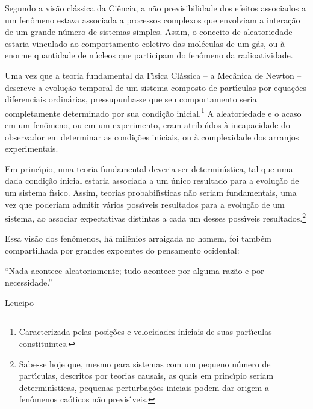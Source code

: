 Segundo a vis\~{a}o cl\'{a}ssica da Ci\^{e}ncia, a n\~{a}o previsibilidade dos efeitos associados a um fen\^{o}meno estava associada a processos complexos que envolviam a intera\c{c}\~{a}o de um grande n\'{u}mero de sistemas simples.
Assim, o conceito de aleatoriedade estaria vinculado ao comportamento coletivo das mol\'{e}culas de um g\'{a}s, ou \`{a} enorme quantidade de n\'{u}cleos que participam do fen\^{o}meno da radioatividade.

Uma vez que a teoria fundamental da F\'{\i}sica Cl\'{a}ssica -- a Mec\^{a}nica de Newton -- descreve a evolu\c{c}\~{a}o temporal
  de um sistema composto de  part\'{\i}culas por equa\c{c}\~{o}es diferenciais ordin\'{a}rias, pressupunha-se que seu comportamento seria completamente determinado por sua condi\c{c}\~{a}o  inicial.\footnote{Caracterizada pelas posi\c{c}\~{o}es e velocidades iniciais de suas part\'{\i}culas constituintes.}  A aleatoriedade e o acaso em um fen\^{o}meno, ou em um experimento, eram atribu\'{\i}dos \`{a} incapacidade do observador em determinar as condi\c{c}\~{o}es iniciais, ou \`{a} complexidade dos arranjos experimentais.

  Em princ\'{\i}pio,  uma teoria fundamental deveria ser determin\'{\i}stica, tal que  uma dada condi\c{c}\~{a}o inicial estaria associada a um \'{u}nico resultado para a evolu\c{c}\~{a}o de um sistema f\'{\i}sico.
  Assim, teorias probabil\'{\i}sticas n\~{a}o seriam fundamentais, uma vez que poderiam admitir v\'{a}rios poss\'{\i}veis resultados para a evolu\c{c}\~{a}o de um sistema, ao associar expectativas distintas a cada um desses poss\'{\i}veis resultados.\footnote{Sabe-se hoje que, mesmo para sistemas com um pequeno n\'{u}mero de part\'{\i}culas, descritos por teorias causais, as quais em princ\'{\i}pio seriam determin\'{\i}sticas, pequenas perturba\c{c}\~{o}es iniciais podem dar origem a fen\^{o}menos ca\'{o}ticos n\~{a}o previs\'{\i}veis.}

Essa vis\~{a}o dos fen\^{o}menos, h\'{a} mil\^{e}nios arraigada no homem, foi tamb\'{e}m com\-par\-ti\-lha\-da por grandes expoentes do pensamento ocidental:

\begin{center}
\begin{minipage}{10cm}
 ``Nada acontece aleatoriamente; tudo acontece por al\-gu\-ma raz\~{a}o e por necessidade.''

\smallskip
\hfill Leucipo
\end{minipage}
\end{center}


